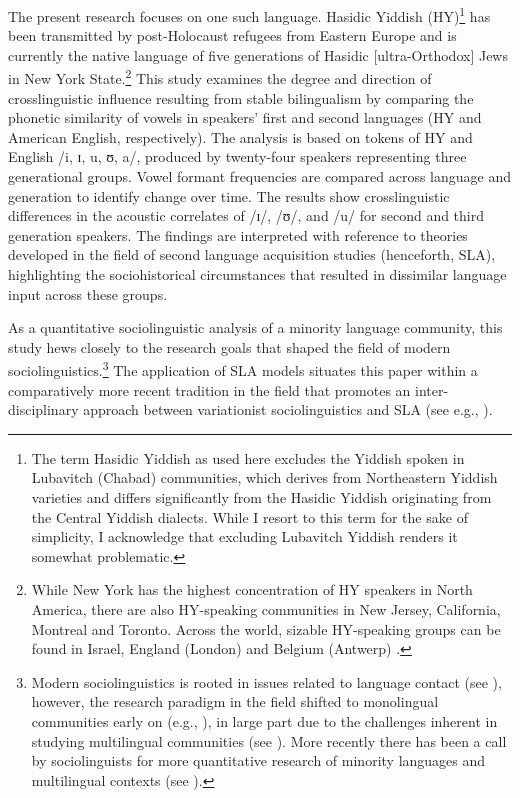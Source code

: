 \documentclass[output=paper]{langsci/langscibook}
\begin{document}
The present research focuses on one such language. Hasidic Yiddish (HY)\footnote{The term Hasidic Yiddish as used here excludes the Yiddish spoken in Lubavitch (Chabad) communities, which derives from Northeastern Yiddish varieties and differs significantly from the Hasidic Yiddish originating from the Central Yiddish dialects. While I resort to this term for the sake of simplicity, I acknowledge that excluding Lubavitch Yiddish renders it somewhat problematic.}  has been transmitted by post-Holocaust refugees from Eastern Europe and is currently the native language of five generations of Hasidic [ultra-Orthodox] Jews in New York State.\footnote{While New York has the highest concentration of HY speakers in North America, there are also HY-speaking communities in New Jersey, California, Montreal and Toronto. Across the world, sizable HY-speaking groups can be found in Israel, England (London) and Belgium (Antwerp) \citep{Assouline2018}.} This study examines the degree and direction of crosslinguistic influence resulting from stable bilingualism by comparing the phonetic similarity of vowels in speakers’ first and second languages (HY and American English, respectively). The analysis is based on tokens of HY and English /i, ɪ, u, ʊ, a/, produced by twenty-four speakers representing three generational groups. Vowel formant frequencies are compared across language and generation to identify change over time. The results show crosslinguistic differences in the acoustic correlates of /ɪ/, /ʊ/, and /u/ for second and third generation speakers. The findings are interpreted with reference to theories developed in the field of second language acquisition studies (henceforth, SLA), highlighting the sociohistorical circumstances that resulted in dissimilar language input across these groups. 

As a quantitative sociolinguistic analysis of a minority language community, this study hews closely to the research goals that shaped the field of modern sociolinguistics.\footnote{Modern sociolinguistics is rooted in issues related to language contact (see \citealt{Weinreich1970}), however, the research paradigm in the field shifted to monolingual communities early on (e.g., \citealt{labov_social_2006}), in large part due to the challenges inherent in studying multilingual communities (see \citealt{Sankoff2002}). More recently there has been a call by sociolinguists for more quantitative research of minority languages and multilingual contexts (see \citealt{GuyAdli2019, NagyMeyerhoff2008, Stanford2016}).} The application of SLA models situates this paper within a comparatively more recent tradition in the field that promotes an inter-disciplinary approach between variationist sociolinguistics and SLA (see e.g., \citealt{AdamsonRegan1991, Bayley2000, FasoldPreston2007, PrestonBayley1996, Regan2004, Tarone2007, YaoChang2016}). 
\end{document}
